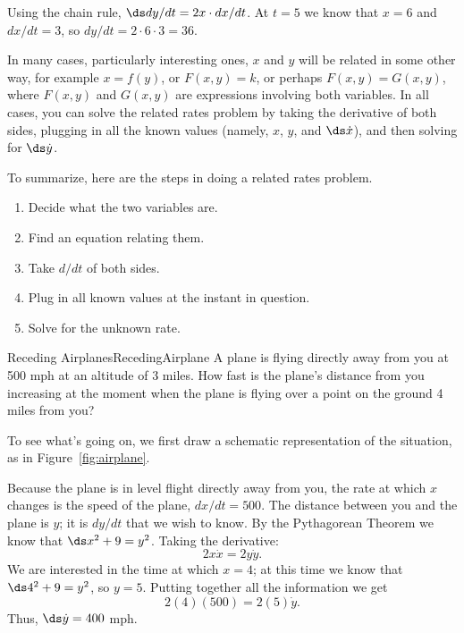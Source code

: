 \begin{solution} 
Using the chain rule, $\ds dy/dt = 2x\cdot dx/dt$. At $t=5$ we know that
$x=6$ and $dx/dt=3$, so $dy/dt = 2\cdot 6\cdot 3 = 36$.
\end{solution}
 
In many cases, particularly interesting ones,
$x$ and $y$ will be related in some other way, for example
$x=f(y)$, or $F(x,y)=k$, or perhaps $F(x,y)=G(x,y)$, where $F(x,y)$
and $G(x,y)$ are expressions involving both variables.  In all cases, you
can solve the related rates problem by taking the derivative of both sides,
plugging in all the known values (namely, $x$, $y$, and $\ds \dot{x}$), and
then solving for $\ds \dot{y}$.

To summarize, here are the steps in doing a related rates problem.

\begin{formulabox}
\begin{enumerate}
	\item	Decide what the two variables are.
	\item	Find an equation relating them.
	\item	Take $d/dt$ of both sides.
	\item	Plug in all known values at the instant in question.
	\item	Solve for the unknown rate.
\end{enumerate}
\end{formulabox}

\begin{example}{Receding Airplanes}{RecedingAirplane}
A plane is flying directly away from you at 500 mph at an altitude of
3 miles.  How fast is the plane's distance from you increasing at the
moment when the plane is flying over a point on the ground 4 miles
from you?
\end{example}

\begin{solution} 
To see what's going on, we first draw a schematic representation of
the situation, as in Figure~\ref{fig:airplane}.

Because the plane is in level flight directly away from you, the rate
at which $x$ changes is the speed of the plane, $dx/dt=500$. The
distance between you and the plane is $y$; it is $dy/dt$ that we wish
to know. By the Pythagorean Theorem we know that $\ds x^2+9=y^2$. Taking
the derivative:
$$ 2x \dot x = 2y\dot y.$$
We are interested in the time at which $x=4$; at this time we know
that $\ds 4^2+9=y^2$, so $y=5$. Putting together all the information we
get
$$2(4)(500)=2(5)\dot y.$$
Thus, $\ds \dot y=400$ mph.
\end{solution}

